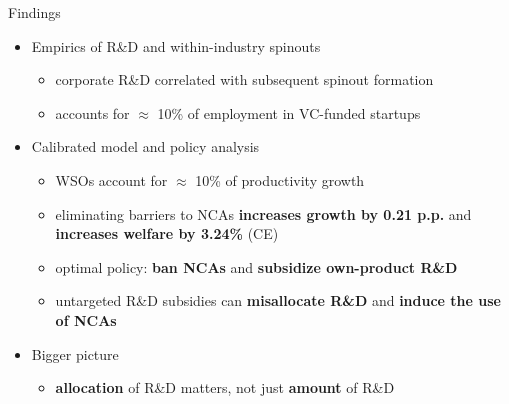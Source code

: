 \documentclass[english,usenames,dvipsnames]{beamer}
\begin{document}
\begin{frame}{Findings}\label{intro_findings}
	\begin{itemize}
		\item<+-> Empirics of R\&D and within-industry spinouts
		\begin{itemize}
			\item corporate R\&D correlated with subsequent spinout formation
			\item accounts for $\approx$ 10\% of employment in VC-funded startups   
		\end{itemize}
		\medskip
		\item<+-> Calibrated model and policy analysis
		\begin{itemize}
			\item WSOs account for $\approx$ 10\% of productivity growth
			\item eliminating barriers to NCAs \alert{\textbf{increases growth by 0.21 p.p.}} and \alert{\textbf{increases welfare by 3.24\%}} (CE)
			\item optimal policy: \alert{\textbf{ban NCAs}} and \alert{\textbf{subsidize own-product R\&D}} 
			\item untargeted R\&D subsidies can \alert{\textbf{misallocate R\&D}} and \alert{\textbf{induce the use of NCAs}}
		\end{itemize}
		\medskip
		\item<+-> Bigger picture
		\begin{itemize}
			\item \alert{\textbf{allocation}} of R\&D matters, not just \alert{\textbf{amount}} of R\&D
		\end{itemize}
	\end{itemize}
\end{frame}
\end{document}
